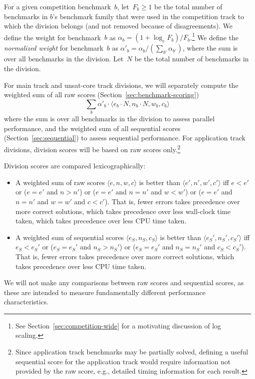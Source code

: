 \documentclass[12pt]{article}
\begin{document}
For a given competition benchmark~$b$, let~$F_b \geq 1$ be the total
number of benchmarks in $b$'s benchmark family that were used in the
competition track to which the division belongs (and not removed
because of disagreements).  We define the weight for benchmark~$b$ as
$\alpha_b = (1 + \log_e F_b) / F_b$.\footnote{See
  Section~\ref{sec:competition-wide} for a motivating discussion of
  log scaling.}  We define the \emph{normalized weight} for
benchmark~$b$ as $\alpha'_b = \alpha_b / (\sum_{b'} \alpha_{b'})$,
where the sum is over all benchmarks in the division.  Let~$N$ be the
total number of benchmarks in the division.

For main track and unsat-core track divisions, we will separately
compute the weighted sum of all raw scores
(Section~\ref{sec:benchmark-scoring}) $$\sum_b \alpha'_b \cdot \langle
e_b \cdot N, n_b \cdot N, w_b, c_b\rangle$$ where the sum is over all
benchmarks in the division to assess parallel performance, and the
weighted sum of all sequential scores (Section~\ref{sec:sequential})
to assess sequential performance.  For application track divisions,
division scores will be based on raw scores only.\footnote{Since
  application track benchmarks may be partially solved, defining a
  useful sequential score for the application track would require
  information not provided by the raw score, e.g., detailed timing
  information for each result.}

Division scores are compared lexicographically:
\begin{itemize}
\item A weighted sum of raw scores $\langle e, n, w, c\rangle$ is
  better than $\langle e', n', w', c'\rangle$ iff $e < e'$ or ($e =
  e'$ and $n > n'$) or ($e = e'$ and $n = n'$ and $w < w'$) or ($e =
  e'$ and $n = n'$ and $w = w'$ and $c < c'$).  That is, fewer errors
  takes precedence over more correct solutions, which takes precedence
  over less wall-clock time taken, which takes precedence over less
  CPU time taken.
\item A weighted sum of sequential scores $\langle e_S, n_S,
  c_S\rangle$ is better than $\langle e_S', n_S', c_S'\rangle$ iff
  $e_S < e_S'$ or ($e_S = e_S'$ and $n_S > n_S'$) or ($e_S = e_S'$ and
  $n_S = n_S'$ and $c_S < c_S'$).  That is, fewer errors takes
  precedence over more correct solutions, which takes precedence over
  less CPU time taken.
\end{itemize}
%
We will not make any comparisons between raw scores and sequential
scores, as these are intended to measure fundamentally different
performance characteristics.
\end{document}
